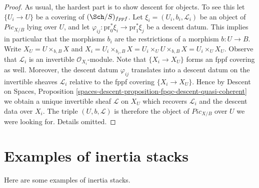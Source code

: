 \begin{proof}
As usual, the hardest part is to show descent for objects.
To see this let $\{U_i \to U\}$ be a covering of $(\Sch/S)_{fppf}$.
Let $\xi_i = (U_i, b_i, \mathcal{L}_i)$ be an object of
$\textit{Pic}_{X/B}$ lying over $U$, and let
$\varphi_{ij} : \text{pr}_0^*\xi_i \to \text{pr}_1^*\xi_j$
be a descent datum. This implies in particular that the morphisms
$b_i$ are the restrictions of a morphism $b : U \to B$.
Write $X_U = U \times_{b, B} X$ and
$X_i = U_i \times_{b_i, B} X =
U_i \times_U U \times_{b, B} X = U_i \times_U X_U$.
Observe that $\mathcal{L}_i$ is an invertible $\mathcal{O}_{X_i}$-module.
Note that $\{X_i \to X_U\}$ forms an fppf covering as well.
Moreover, the descent datum $\varphi_{ij}$ translates into a
descent datum on the invertible sheaves $\mathcal{L}_i$ relative
to the fppf covering $\{X_i \to X_U\}$.
Hence by
Descent on Spaces,
Proposition \ref{spaces-descent-proposition-fpqc-descent-quasi-coherent}
we obtain a unique invertible sheaf $\mathcal{L}$ on $X_U$
which recovers $\mathcal{L}_i$ and the descent data over $X_i$.
The triple $(U, b, \mathcal{L})$ is therefore the object of
$\textit{Pic}_{X/B}$ over $U$ we were looking for.
Details omitted.
\end{proof}





\section{Examples of inertia stacks}
\label{section-examples-inertia}

\noindent
Here are some examples of inertia stacks.

